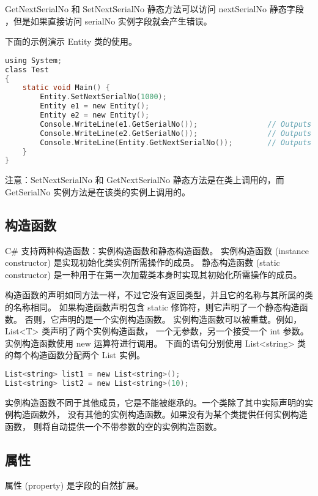 GetNextSerialNo 和 SetNextSerialNo 静态方法可以访问 nextSerialNo 静态字段
，但是如果直接访问 serialNo 实例字段就会产生错误。

下面的示例演示 Entity 类的使用。

 \begin{lstlisting}[language=C]
using System;
class Test
{
    static void Main() {
        Entity.SetNextSerialNo(1000);
        Entity e1 = new Entity();
        Entity e2 = new Entity();
        Console.WriteLine(e1.GetSerialNo());                // Outputs "1000"
        Console.WriteLine(e2.GetSerialNo());                // Outputs "1001"
        Console.WriteLine(Entity.GetNextSerialNo());        // Outputs "1002"
    }
}
 \end{lstlisting}

注意：SetNextSerialNo 和 GetNextSerialNo 静态方法是在类上调用的，而 GetSerialNo 实例方法是在该类的实例上调用的。


\subsection{构造函数}
C\# 支持两种构造函数：实例构造函数和静态构造函数。
实例构造函数 (instance constructor) 是实现初始化类实例所需操作的成员。
静态构造函数 (static constructor) 是一种用于在第一次加载类本身时实现其初始化所需操作的成员。

构造函数的声明如同方法一样，不过它没有返回类型，并且它的名称与其所属的类的名称相同。
如果构造函数声明包含 static 修饰符，则它声明了一个静态构造函数。
否则，它声明的是一个实例构造函数。
实例构造函数可以被重载。例如，List<T> 类声明了两个实例构造函数，
一个无参数，另一个接受一个 int 参数。实例构造函数使用 new 运算符进行调用。
下面的语句分别使用 List<string> 类的每个构造函数分配两个 List 实例。

 \begin{lstlisting}[language=C]
List<string> list1 = new List<string>();
List<string> list2 = new List<string>(10);
 \end{lstlisting}

实例构造函数不同于其他成员，它是不能被继承的。一个类除了其中实际声明的实例构造函数外，
没有其他的实例构造函数。如果没有为某个类提供任何实例构造函数，
则将自动提供一个不带参数的空的实例构造函数。

\subsection{属性}

属性 (property) 是字段的自然扩展。

